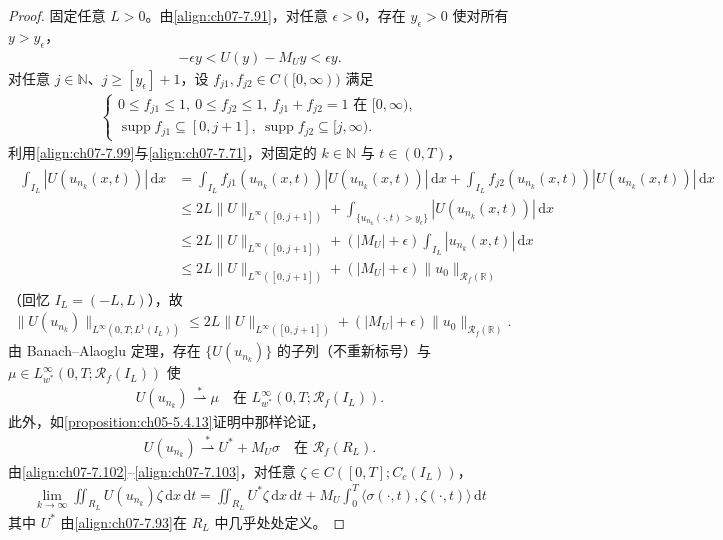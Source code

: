 \documentclass[../../main.tex]{subfiles}%
\begin{document}
\begin{proof}
固定任意 $L>0$。由\eqref{align:ch07-7.91}，对任意 $\epsilon>0$，存在 $y_\epsilon>0$ 使对所有 $y>y_\epsilon$，
\begin{align}
-\epsilon y<U(y)-M_U y<\epsilon y. \label{align:ch07-7.99}
\end{align}
对任意 $j\in\mathbb{N}$、$j\geqslant[y_\epsilon]+1$，设 $f_{j1},f_{j2}\in C([0,\infty))$ 满足
\begin{align}
\begin{cases}
0\leqslant f_{j1}\leqslant1,\ 0\leqslant f_{j2}\leqslant1,\ f_{j1}+f_{j2}=1\text{ 在 }[0,\infty),\\
\operatorname{supp}f_{j1}\subseteq[0,j+1],\ \operatorname{supp}f_{j2}\subseteq[j,\infty).
\end{cases} \label{align:ch07-7.100}
\end{align}
利用\eqref{align:ch07-7.99}与\eqref{align:ch07-7.71}，对固定的 $k\in\mathbb{N}$ 与 $t\in(0,T)$，
\begin{align*}
\begin{aligned}
\int_{I_L}|U(u_{n_k}(x,t))|\,\mathrm{d}x
&=\int_{I_L}f_{j1}(u_{n_k}(x,t))|U(u_{n_k}(x,t))|\,\mathrm{d}x+\int_{I_L}f_{j2}(u_{n_k}(x,t))|U(u_{n_k}(x,t))|\,\mathrm{d}x\\
&\leqslant2L\|U\|_{L^\infty([0,j+1])}+\int_{\{u_{n_k}(\cdot,t)>y_\epsilon\}}|U(u_{n_k}(x,t))|\,\mathrm{d}x\\
&\leqslant2L\|U\|_{L^\infty([0,j+1])}+(|M_U|+\epsilon)\int_{I_L}|u_{n_k}(x,t)|\,\mathrm{d}x\\
&\leqslant2L\|U\|_{L^\infty([0,j+1])}+(|M_U|+\epsilon)\|u_0\|_{\mathscr{R}_f(\mathbb{R})}
\end{aligned}
\end{align*}
（回忆 $I_L=(-L,L)$），故
\begin{align}
\|U(u_{n_k})\|_{L^\infty(0,T;L^1(I_L))}\leqslant2L\|U\|_{L^\infty([0,j+1])}+(|M_U|+\epsilon)\|u_0\|_{\mathscr{R}_f(\mathbb{R})}. \label{align:ch07-7.101}
\end{align}
由 Banach--Alaoglu 定理，存在 $\{U(u_{n_k})\}$ 的子列（不重新标号）与 $\mu\in L^\infty_{w^*}(0,T;\mathscr{R}_f(I_L))$ 使
\begin{align}
U(u_{n_k})\stackrel{*}{\rightharpoonup}\mu\quad\text{在 }L^\infty_{w^*}(0,T;\mathscr{R}_f(I_L)). \label{align:ch07-7.102}
\end{align}
此外，如\cref{proposition:ch05-5.4.13}证明中那样论证，
\begin{align}
U(u_{n_k})\stackrel{*}{\rightharpoonup}U^*+M_U\sigma\quad\text{在 }\mathscr{R}_f(R_L). \label{align:ch07-7.103}
\end{align}
由\eqref{align:ch07-7.102}--\eqref{align:ch07-7.103}，对任意 $\zeta\in C([0,T];C_c(I_L))$，
\begin{align}
\lim_{k\to\infty}\iint_{R_L}U(u_{n_k})\zeta\,\mathrm{d}x\,\mathrm{d}t
=\iint_{R_L}U^*\zeta\,\mathrm{d}x\,\mathrm{d}t+M_U\int_0^T\langle\sigma(\cdot,t),\zeta(\cdot,t)\rangle\,\mathrm{d}t \label{align:ch07-7.104}
\end{align}
其中 $U^*$ 由\eqref{align:ch07-7.93}在 $R_L$ 中几乎处处定义。


\end{proof}
\end{document}
